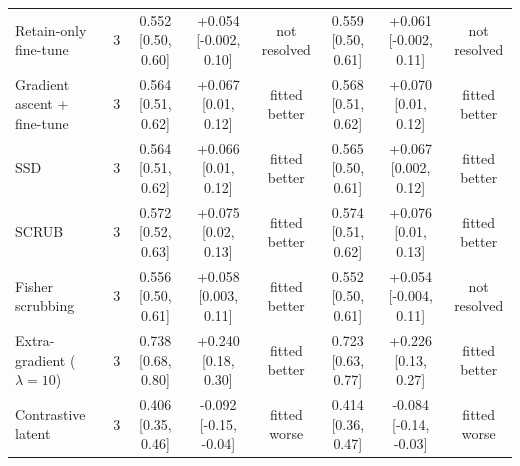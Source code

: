 \begin{tabular}{lccccccc}
Retain-only fine-tune & 3 & 0.552 [0.50, 0.60] & +0.054 [-0.002, 0.10] & not resolved & 0.559 [0.50, 0.61] & +0.061 [-0.002, 0.11] & not resolved \\
Gradient ascent + fine-tune & 3 & 0.564 [0.51, 0.62] & +0.067 [0.01, 0.12] & fitted better & 0.568 [0.51, 0.62] & +0.070 [0.01, 0.12] & fitted better \\
SSD & 3 & 0.564 [0.51, 0.62] & +0.066 [0.01, 0.12] & fitted better & 0.565 [0.50, 0.61] & +0.067 [0.002, 0.12] & fitted better \\
SCRUB & 3 & 0.572 [0.52, 0.63] & +0.075 [0.02, 0.13] & fitted better & 0.574 [0.51, 0.62] & +0.076 [0.01, 0.13] & fitted better \\
Fisher scrubbing & 3 & 0.556 [0.50, 0.61] & +0.058 [0.003, 0.11] & fitted better & 0.552 [0.50, 0.61] & +0.054 [-0.004, 0.11] & not resolved \\
Extra-gradient ($\lambda=10$) & 3 & 0.738 [0.68, 0.80] & +0.240 [0.18, 0.30] & fitted better & 0.723 [0.63, 0.77] & +0.226 [0.13, 0.27] & fitted better \\
Contrastive latent & 3 & 0.406 [0.35, 0.46] & -0.092 [-0.15, -0.04] & fitted worse & 0.414 [0.36, 0.47] & -0.084 [-0.14, -0.03] & fitted worse \\
\bottomrule
\end{tabular}
